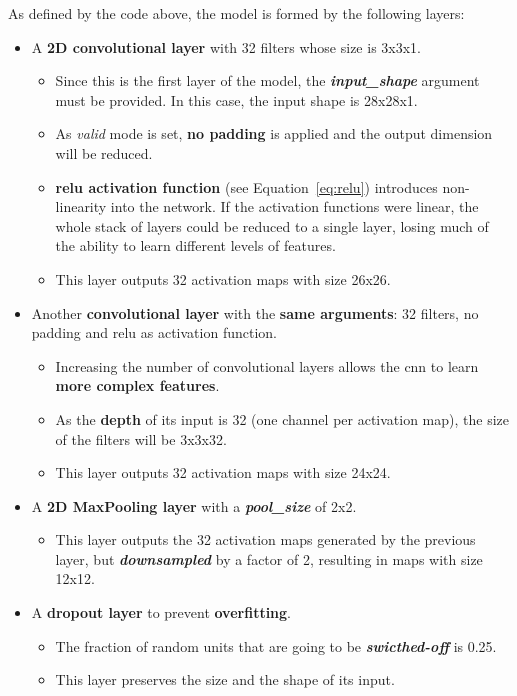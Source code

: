 As defined by the code above, the model is formed by the following layers:
\begin{itemize}
	\item A \textbf{2D convolutional layer} with 32 filters whose size is 3x3x1.
	\begin{itemize}
		\item Since this is the first layer of the model, the \textbf{\textit{input\_shape}} argument must be provided. In this case, the input shape is 28x28x1. 
		\item As \textit{valid} mode is set, \textbf{no padding} is applied and the output dimension will be reduced. 
		\item \textbf{\gls{relu} activation function} (see Equation~\ref{eq:relu}) introduces non-linearity into the network. If the activation functions were linear, the whole stack of layers could be reduced to a single layer, losing much of the ability to learn different levels of features.
		\item This layer outputs 32 activation maps with size 26x26.
	\end{itemize}
		
	\item Another \textbf{convolutional layer} with the \textbf{same arguments}: 32 filters, no padding and \gls{relu} as activation function.
	\begin{itemize}
		\item Increasing the number of convolutional layers allows the \gls{cnn} to learn \textbf{more complex features}. 
		\item As the \textbf{depth} of its input is 32 (one channel per activation map), the size of the filters will be 3x3x32. 
		\item This layer outputs 32 activation maps with size 24x24.
	\end{itemize}
	
	\item A \textbf{2D MaxPooling layer} with a \textbf{\textit{pool\_size}} of 2x2.
	\begin{itemize}
		\item This layer outputs the 32 activation maps generated by the previous layer, but \textbf{\textit{downsampled}} by a factor of 2, resulting in maps with size 12x12.
	\end{itemize}
	
	\item A \textbf{dropout layer} to prevent \textbf{overfitting}. 
	\begin{itemize}
		\item The fraction of random units that are going to be \textbf{\textit{swicthed-off}} is 0.25.
		\item This layer preserves the size and the shape of its input.
	\end{itemize} 
	

\end{itemize}
